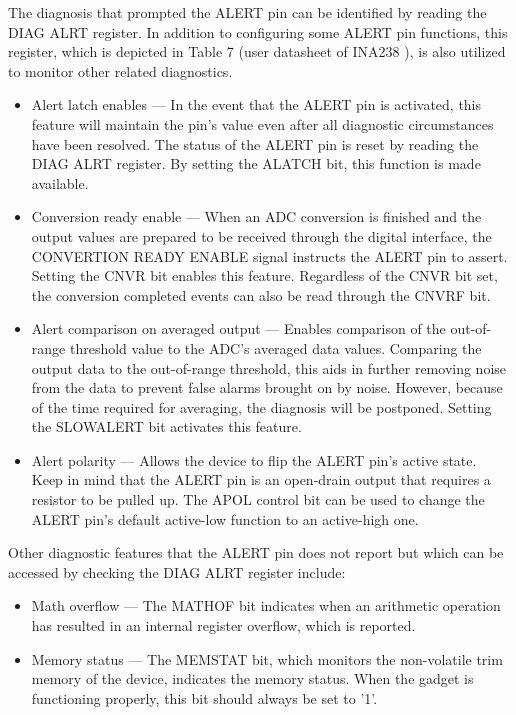 The diagnosis that prompted the ALERT pin can be identified by reading the DIAG ALRT register. In addition to configuring some ALERT pin functions, this register, which is depicted in Table 7 (user datasheet of INA238 \cite{INA238_User_Datasheet}), is also utilized to monitor other related diagnostics.

\begin{itemize}
	\item Alert latch enables — In the event that the ALERT pin is activated, this feature will maintain the pin's value even after all diagnostic circumstances have been resolved. The status of the ALERT pin is reset by reading the DIAG ALRT register. By setting the ALATCH bit, this function is made available.
	\item Conversion ready enable —  When an ADC conversion is finished and the output values are prepared to be received through the digital interface, the CONVERTION READY ENABLE signal instructs the ALERT pin to assert. Setting the CNVR bit enables this feature. Regardless of the CNVR bit set, the conversion completed events can also be read through the CNVRF bit.
	\item Alert comparison on averaged output — Enables comparison of the out-of-range threshold value to the ADC's averaged data values. Comparing the output data to the out-of-range threshold, this aids in further removing noise from the data to prevent false alarms brought on by noise. However, because of the time required for averaging, the diagnosis will be postponed. Setting the SLOWALERT bit activates this feature.
	\item Alert polarity — Allows the device to flip the ALERT pin's active state. Keep in mind that the ALERT pin is an open-drain output that requires a resistor to be pulled up. The APOL control bit can be used to change the ALERT pin's default active-low function to an active-high one.
\end{itemize}

Other diagnostic features that the ALERT pin does not report but which can be accessed by checking the DIAG ALRT register include:

\begin{itemize}
	\item Math overflow — The MATHOF bit indicates when an arithmetic operation has resulted in an internal register overflow, which is reported.
	\item Memory status — The MEMSTAT bit, which monitors the non-volatile trim memory of the device, indicates the memory status. When the gadget is functioning properly, this bit should always be set to '1'.
\end{itemize}

